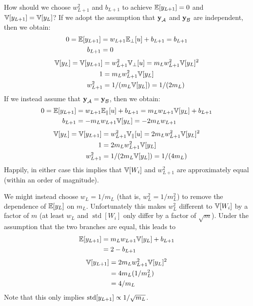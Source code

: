 How should we choose $w_{L+1}^2$ and $b_{L+1}$ to achieve $\mathbb{E}[y_{L+1}] = 0$ and $\mathbb{V}[y_{L+1}] = \mathbb{V}[y_{L}]$?
If we adopt the assumption that $\boldsymbol{\mathbf{y}}_{\mathcal{A}}$ and $\boldsymbol{\mathbf{y}}_{\mathcal{B}}$ are independent, then we obtain:
\begin{align}
0 = \mathbb{E}[y_{L+1}] & = w_{L+1} \mathbb{E}_{\bot}[u] + b_{L+1} = b_{L+1} \\
b_{L+1} & = 0
\end{align}
\begin{align}
\mathbb{V}[y_{L}] = \mathbb{V}[y_{L+1}] & = w_{L+1}^2 \mathbb{V}_{\bot}[u] = m_{L} w_{L+1}^2 \mathbb{V}[y_{L}]^2 \\
1 & = m_{L} w_{L+1}^2 \mathbb{V}[y_{L}] \\
w_{L+1}^2 & = 1 / (m_{L} \mathbb{V}[y_{L}]) = 1 / (2 m_{L})
\end{align}
If we instead assume that $\boldsymbol{\mathbf{y}}_{\mathcal{A}} = \boldsymbol{\mathbf{y}}_{\mathcal{B}}$, then we obtain:
\begin{align}
0 = \mathbb{E}[y_{L+1}] & = w_{L+1} \mathbb{E}_{\parallel}[u] + b_{L+1} = m_{L} w_{L+1} \mathbb{V}[y_{L}] + b_{L+1} \\
b_{L+1} & = -m_{L} w_{L+1} \mathbb{V}[y_{L}] = -2 m_{L} w_{L+1}
\end{align}
\begin{align}
\mathbb{V}[y_{L}] = \mathbb{V}[y_{L+1}] & = w_{L+1}^2 \mathbb{V}_{\parallel}[u] = 2 m_{L} w_{L+1}^2 \mathbb{V}[y_{L}]^2 \\
1 & = 2 m_{L} w_{L+1}^2 \mathbb{V}[y_{L}] \\
w_{L+1}^2 & = 1 / (2 m_{L} \mathbb{V}[y_{L}]) = 1 / (4 m_{L})
\end{align}
Happily, in either case this implies that $\mathbb{V}[W_{i}]$ and $w_{L+1}^2$ are approximately equal (within an order of magnitude).

We might instead choose $w_{L} = 1 / m_{L}$ (that is, $w_{L}^2 = 1 / m_{L}^2$) to remove the dependence of $\mathbb{E}[y_{L}]$ on $m_{L}$.
Unfortunately this makes $w_{L}^2$ different to $\mathbb{V}[W_{i}]$ by a factor of $m$ (at least $w_{L}$ and $\operatorname{std}[W_{i}]$ only differ by a factor of $\sqrt{m}$).
Under the assumption that the two branches are equal, this leads to
\begin{align}
\mathbb{E}[y_{L+1}] & = m_{L} w_{L+1} \mathbb{V}[y_{L}] + b_{L+1} \\
& = 2 - b_{L+1}
\end{align}
\begin{align}
\mathbb{V}[y_{L+1}] & = 2 m_{L} w_{L+1}^2 \mathbb{V}[y_{L}]^2 \\
& = 4 m_{L} (1 / m_{L}^2) \\
& = 4 / m_{L}
\end{align}
Note that this only implies $\operatorname{std}[y_{L+1}] \propto 1 / \sqrt{m_{L}}$.

